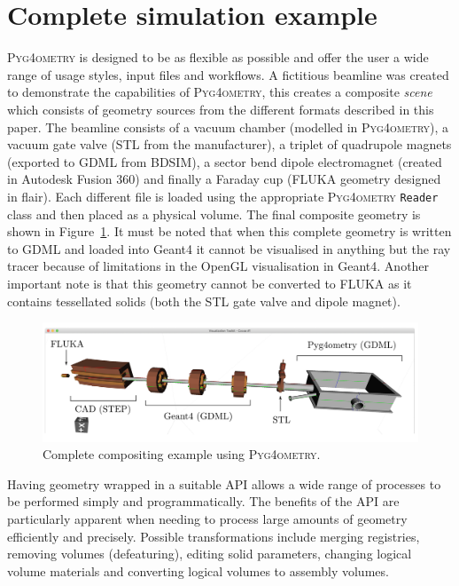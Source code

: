 \documentclass[final,5p,times,twocolumn]{elsarticle}
\newcommand{\pyinline}[1]{\lstinline[postbreak={}]{#1}}
\newcommand{\PYGEOMETRY}{\textsc{Pyg4ometry}}
\begin{document}
\section{Complete simulation example}
\PYGEOMETRY{} is designed to be as flexible as possible and offer the user a wide range of usage styles, input files
and workflows. A fictitious beamline was created to demonstrate the capabilities of \PYGEOMETRY, this creates a composite
\emph{scene} which consists of geometry sources from the different formats described in this paper. The beamline consists of a vacuum chamber
(modelled in \PYGEOMETRY{}), a vacuum gate valve (STL from the manufacturer), a triplet of quadrupole magnets (exported to GDML
from BDSIM), a sector bend dipole electromagnet (created in Autodesk Fusion 360) and finally a Faraday cup (FLUKA geometry designed in
flair). Each different file is loaded using the appropriate \PYGEOMETRY{} \pyinline{Reader} class and then placed as a physical volume. The final composite
geometry is shown in Figure~\ref{fig:model}. It must be noted that when this complete geometry is written to GDML and loaded into
Geant4 it cannot be visualised in anything but the ray tracer because of limitations in the OpenGL visualisation in Geant4. Another
important note is that this geometry cannot be converted to FLUKA as it contains tessellated solids (both the STL gate valve and
dipole magnet).
%
\begin{figure}
\begin{center}
\includegraphics[width=1.0\textwidth]{./model-scene/model.pdf}
\caption{Complete compositing example using \PYGEOMETRY{}.}
\label{fig:model}
\end{center}
\end{figure}

Having geometry wrapped in a suitable API allows a wide range of processes to be performed simply and programmatically. The benefits of the API are
particularly apparent when needing to process large amounts of geometry efficiently and precisely. Possible transformations include merging registries,
removing volumes (defeaturing), editing solid parameters, changing logical volume materials and converting logical volumes to assembly volumes.
\end{document}
